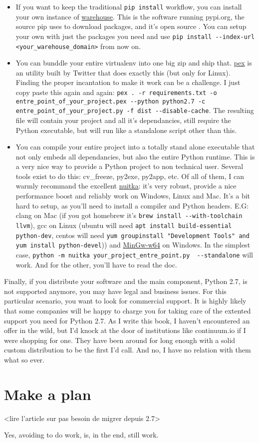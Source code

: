 \begin{itemize}

\item If you want to keep the traditional \lstinline{pip install} workflow, you can install your own instance of \href{https://github.com/pypa/warehouse}{warehouse}. This is the software running pypi.org, the source pip uses to download packages, and it's open source . You can setup your own with just the packages you need and use \lstinline{pip install --index-url <your_warehouse_domain>} from now on.
\item You can bunddle your entire virtualenv into one big zip and ship that. \href{https://github.com/pantsbuild/pex}{pex} is an utility built by Twitter that does exactly this (but only for Linux). Finding the proper incantation to make it work can be a challenge. I just copy paste this again and again: \lstinline{pex . -r requirements.txt -o entre_point_of_your_project.pex --python python2.7 -c entre_point_of_your_project.py -f dist --disable-cache}. The resulting file will contain your project and all it's dependancies, still require the Python executable, but will run like a standalone script other than this.
\item You can compile your entire project into a totally stand alone executable that not only embeds all dependancies, but also the entire Python runtime. This is a very nice way to provide a Python project to non technical user. Several tools exist to do this: cv_freeze, py2exe, py2app, etc. Of all of them, I can warmly recommand the excellent \href{nuitka.net}{nuitka}: it's very robust, provide a nice performance boost and reliably work on Windows, Linux and Mac. It's a bit hard to setup, as you'll need to install a compiler and Python headers. E.G: clang on Mac  (if you got homebrew it's \lstinline{brew install --with-toolchain llvm}), gcc on Linux (ubuntu will need \lstinline{apt install build-essential python-dev}, centos will need \lstinline{yum groupinstall "Development Tools" and yum install python-devel})) and \href{https://sourceforge.net/projects/mingw-w64/}{MinGw-w64} on Windows. In the simplest case, \lstinline{python -m nuitka your_project_entre_point.py  --standalone} will work. And for the other, you'll have to read the doc.
\end{itemize}

Finally, if you distribute your software and the main component, Python 2.7, is not supported anymore, you may have legal and business issues. For this particular scenario, you want to look for commercial support. It is highly likely that some companies will be happy to charge you for taking care of the extented support you need for Python 2.7. As I write this book, I haven't encountered an offer in the wild, but I'd knock at the door of institutions like continuum.io if I were shopping for one. They have been around for long enough with a solid custom distribution to be the first I'd call. And no, I have no relation with them what so ever.

\section{Make a plan}

<lire l'article sur pas besoin de migrer depuis 2.7>

Yes, avoiding to do work, is, in the end, still work.

